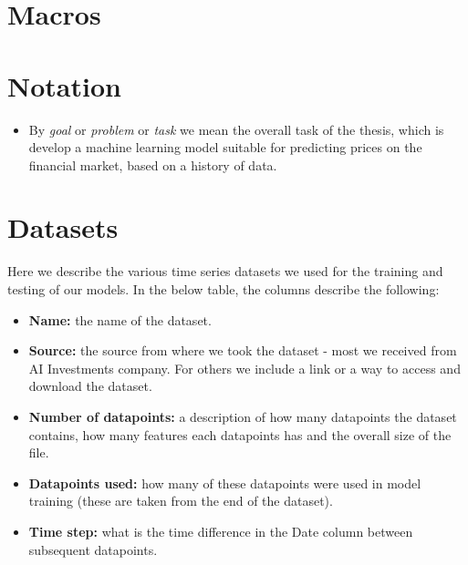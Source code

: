 \section{Macros}

\section{Notation}
\begin{itemize}
	\item By \emph{goal} or \emph{problem} or \emph{task} we mean the overall task of the thesis, which is develop a machine learning model suitable for predicting prices on the financial market, based on a history of data.
\end{itemize}

\section{Datasets}
Here we describe the various time series datasets we used for the training and testing of our models. In the below table, the columns describe the following:
\begin{itemize}
	\item \textbf{Name:} the name of the dataset.
	\item \textbf{Source:} the source from where we took the dataset - most we received from AI Investments company. For others we include a link or a way to access and download the dataset.
	\item \textbf{Number of datapoints:} a description of how many datapoints the dataset contains, how many features each datapoints has and the overall size of the file.
	\item \textbf{Datapoints used:} how many of these datapoints were used in model training (these are taken from the end of the dataset).
	\item \textbf{Time step:} what is the time difference in the Date column between subsequent datapoints.
\end{itemize}



